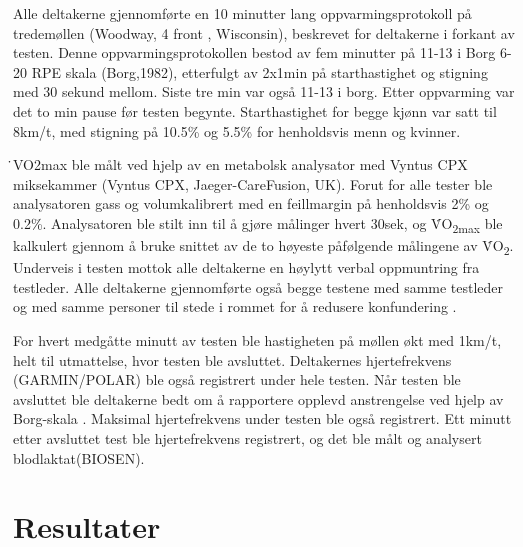 \documentclass[
]{book}
\begin{document}
Alle deltakerne gjennomførte en 10 minutter lang oppvarmingsprotokoll på
tredemøllen (Woodway, 4 front , Wisconsin), beskrevet for deltakerne i
forkant av testen. Denne oppvarmingsprotokollen bestod av fem minutter
på 11-13 i Borg 6-20 RPE skala (Borg,1982),
etterfulgt av 2x1min på starthastighet og stigning med 30 sekund
mellom.
Siste tre min var også 11-13 i
borg. Etter oppvarming
var det to min pause før testen begynte. Starthastighet for begge
kjønn var satt til
8km/t, med stigning på 10.5\% og 5.5\% for henholdsvis menn og kvinner.

̇VO2max ble målt ved hjelp av en metabolsk analysator med
Vyntus CPX miksekammer (Vyntus CPX, Jaeger-CareFusion, UK). Forut for
alle tester ble analysatoren gass og volumkalibrert med en feillmargin
på henholdsvis 2\% og 0.2\%. Analysatoren ble
stilt inn til å gjøre målinger hvert 30sek, og V̇O\textsubscript{2max} ble kalkulert
gjennom å bruke snittet av de to høyeste påfølgende målingene av V̇O\textsubscript{2}.
Underveis i testen mottok alle deltakerne en høylytt verbal oppmuntring
fra testleder. Alle deltakerne
gjennomførte også begge testene med samme testleder og med samme
personer til stede i rommet for å redusere konfundering \citep{halperin1923}.

For hvert medgåtte minutt av testen ble hastigheten på møllen økt med
1km/t, helt til utmattelse, hvor testen ble avsluttet. Deltakernes
hjertefrekvens (GARMIN/POLAR) ble også registrert under hele testen. Når
testen ble avsluttet ble deltakerne bedt om å rapportere opplevd
anstrengelse ved hjelp av Borg-skala \citep{borg1982}. Maksimal
hjertefrekvens under testen ble også registrert. Ett minutt etter
avsluttet test ble hjertefrekvens registrert, og det ble målt og
analysert blodlaktat(BIOSEN).

\hypertarget{resultater}{%
\section{Resultater}\label{resultater}}

\providecommand{\docline}[3]{\noalign{\global\setlength{\arrayrulewidth}{#1}}\arrayrulecolor[HTML]{#2}\cline{#3}}

\setlength{\tabcolsep}{2pt}

\renewcommand*{\arraystretch}{1.5}
\end{document}
